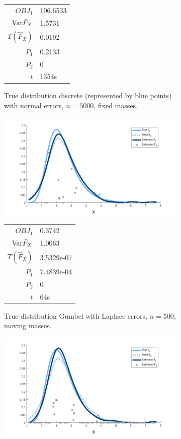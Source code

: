 \begin{figure}
\begin{subfigure}[b]{0.38\textwidth}
		\begin{tabular}{r l}
			$OBJ_1$ & 106.6533\\
			$\mathrm{Var} \hat{F}_X$ & 1.5731\\
			$T(\hat{F}_X)$ & 0.0192\\
			$P_1$ & 0.2133\\
			$P_2$ & 0\\
			$t$ & 1354s
		\end{tabular}
		\caption{True distribution discrete (represented by blue points) with normal errors, $n = 5000$, fixed masses.}
		\label{fig:fixed masses discrete}
	\end{subfigure}
	\begin{subfigure}[b]{0.38\textwidth}
		\centering
		\includegraphics[width = \textwidth]{Figures/Deconvolution/moving_masses_gumbel_lap_example.png}
		\begin{tabular}{r l}
			$OBJ_1$ & 0.3742\\
			$\mathrm{Var} \hat{F}_X$ & 1.0063\\
			$T(\hat{F}_X)$ & 3.5329e-07\\
			$P_1$ & 7.4839e-04\\
			$P_2$ & 0\\
			$t$ & 64s
		\end{tabular}
		\caption{True distribution Gumbel with Laplace errors, $n = 500$, moving masses.}
		\label{fig:moving masses gumbel lap}
	\end{subfigure}
	\hfill
	\begin{subfigure}[b]{0.38\textwidth}
		\centering
		\includegraphics[width = \textwidth]{Figures/Deconvolution/fixed_masses_gumbel_lap_example.png}

\end{subfigure}
\end{figure}

